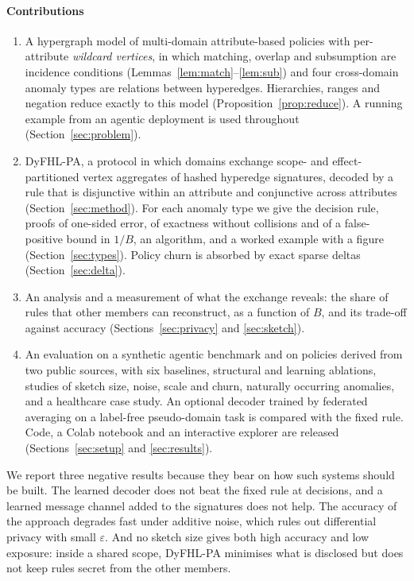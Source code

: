 \documentclass[preprint,12pt]{elsarticle}
\theoremstyle{definition}
\newcommand{\name}{DyFHL-PA\xspace}
\begin{document}
\paragraph{Contributions}
\begin{enumerate}
\item A hypergraph model of multi-domain attribute-based policies with per-attribute \emph{wildcard vertices}, in which matching, overlap and subsumption are incidence conditions (Lemmas~\ref{lem:match}--\ref{lem:sub}) and four cross-domain anomaly types are relations between hyperedges. Hierarchies, ranges and negation reduce exactly to this model (Proposition~\ref{prop:reduce}). A running example from an agentic deployment is used throughout (Section~\ref{sec:problem}).
\item \name, a protocol in which domains exchange scope- and effect-partitioned vertex aggregates of hashed hyperedge signatures, decoded by a rule that is disjunctive within an attribute and conjunctive across attributes (Section~\ref{sec:method}). For each anomaly type we give the decision rule, proofs of one-sided error, of exactness without collisions and of a false-positive bound in $1/B$, an algorithm, and a worked example with a figure (Section~\ref{sec:types}). Policy churn is absorbed by exact sparse deltas (Section~\ref{sec:delta}).
\item An analysis and a measurement of what the exchange reveals: the share of rules that other members can reconstruct, as a function of $B$, and its trade-off against accuracy (Sections~\ref{sec:privacy} and \ref{sec:sketch}).
\item An evaluation on a synthetic agentic benchmark and on policies derived from two public sources, with six baselines, structural and learning ablations, studies of sketch size, noise, scale and churn, naturally occurring anomalies, and a healthcare case study. An optional decoder trained by federated averaging on a label-free pseudo-domain task is compared with the fixed rule. Code, a Colab notebook and an interactive explorer are released (Sections~\ref{sec:setup} and \ref{sec:results}).
\end{enumerate}

We report three negative results because they bear on how such systems should be built. The learned decoder does not beat the fixed rule at decisions, and a learned message channel added to the signatures does not help. The accuracy of the approach degrades fast under additive noise, which rules out differential privacy with small $\varepsilon$. And no sketch size gives both high accuracy and low exposure: inside a shared scope, \name minimises what is disclosed but does not keep rules secret from the other members.
\end{document}
